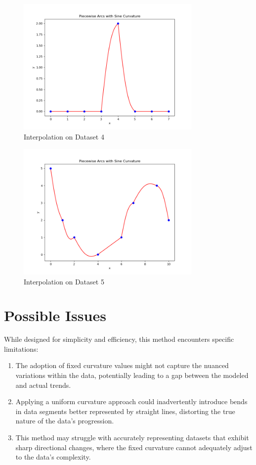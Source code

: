 \documentclass{article}
\begin{document}
\begin{figure}[htbp]
\centering
\includegraphics[width=0.8\textwidth]{test_case_4.png}
\caption{Interpolation on Dataset 4}
\end{figure}

\begin{figure}[htbp]
\centering
\includegraphics[width=0.8\textwidth]{test_case_5.png}
\caption{Interpolation on Dataset 5}
\end{figure}

\newpage
\section{Possible Issues}
While designed for simplicity and efficiency, this method encounters specific limitations:
\begin{enumerate}
    \item The adoption of fixed curvature values might not capture the nuanced variations within the data, potentially leading to a gap between the modeled and actual trends.
    \item Applying a uniform curvature approach could inadvertently introduce bends in data segments better represented by straight lines, distorting the true nature of the data's progression.
    \item This method may struggle with accurately representing datasets that exhibit sharp directional changes, where the fixed curvature cannot adequately adjust to the data's complexity.
\end{enumerate}
\end{document}
